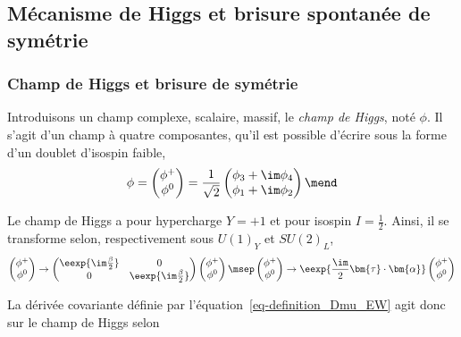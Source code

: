 \subsection{Mécanisme de Higgs et brisure spontanée de symétrie}\label{chapter-MS-MSSM-section-formalisme-subsec-Higgs_mechanism}
\subsubsection{Champ de Higgs et brisure de symétrie}\label{chapter-MS-MSSM-section-formalisme-subsec-Higgs_mechanism-subsubsec-potentiel}
Introduisons un champ complexe, scalaire, massif, le \emph{champ de Higgs}, noté $\phi$. Il s'agit d'un champ à quatre composantes, qu'il est possible d'écrire sous la forme d'un doublet d'isospin faible,
\begin{equation}
\phi
=
\begin{pmatrix}
\phi^+ \\ \phi^0
\end{pmatrix}
=
\frac{1}{\sqrt{2}}
\begin{pmatrix}
\phi_3 + \im \phi_4 \\ \phi_1 + \im \phi_2
\end{pmatrix}
\mend
\end{equation}
\par Le champ de Higgs a pour hypercharge $Y=+1$ et pour isospin $I=\frac{1}{2}$. Ainsi, il se transforme selon, respectivement sous $U(1)_Y$ et $SU(2)_L$,
\begin{equation}
\begin{pmatrix}
\phi^+ \\ \phi^0
\end{pmatrix}
\to
\begin{pmatrix}
\eexp{\im\frac{\beta}{2}} & 0 \\ 0 & \eexp{\im\frac{\beta}{2}}
\end{pmatrix}
\begin{pmatrix}
\phi^+ \\ \phi^0
\end{pmatrix}
\msep
\begin{pmatrix}
\phi^+ \\ \phi^0
\end{pmatrix}
\to
\eexp{\frac{\im}{2}\bm{\tau}\cdot\bm{\alpha}}
\begin{pmatrix}
\phi^+ \\ \phi^0
\end{pmatrix}
\end{equation}
\par La dérivée covariante définie par l'équation~\eqref{eq-definition_Dmu_EW} agit donc sur le champ de Higgs selon
